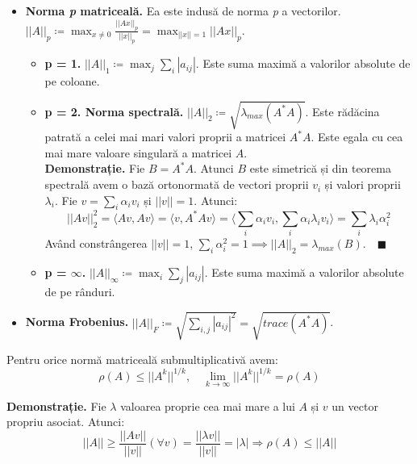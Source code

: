 \documentclass{exam}
\begin{document}
\begin{itemize}
	\item \textbf{Norma \textit{p} matriceală.} Ea este indusă de norma \textit{p} a vectorilor. \\
	      $||A||_p \coloneq \max_{x \neq 0} \frac{||Ax||_p}{||x||_p} = \max_{||x|| = 1} ||Ax||_p$.
	      \begin{itemize}
		      \item \textbf{p = 1.} $||A||_1 \coloneq \max_j \sum_i |a_{ij}|$. Este suma maximă a valorilor absolute
		            de pe coloane.
		      \item \textbf{p = 2. Norma spectrală.} $||A||_2 \coloneq \sqrt{\lambda_{max}(A^*A)}$.
		            Este rădăcina patrată a celei mai mari valori proprii a matricei $A^*A$.
		            Este egala cu cea mai mare valoare singulară a matricei $A$. \\
		            \textbf{Demonstrație.} Fie $B = A^*A$. Atunci $B$ este
		            simetrică și din teorema spectrală avem o bază ortonormată
		            de vectori proprii $v_i$ și valori proprii $\lambda_i$.
		            Fie $v = \sum_i \alpha_i v_i$ și $||v|| = 1$. Atunci:
		            \begin{equation*}
			            ||Av||^2_2 = \langle Av, Av \rangle = \langle v, A^*Av \rangle = \langle  \sum_{i} \alpha_i v_i, \sum_{i} \alpha_i \lambda_i v_i \rangle = \sum_{i} \lambda_i \alpha_i^2
		            \end{equation*}
		            Având constrângerea $||v|| = 1$, $\sum_{i} \alpha_i^2 = 1 \implies ||A||_2 = \lambda_{max}(B). \quad \blacksquare$

		      \item \textbf{p = $\infty$.} $||A||_{\infty} \coloneq \max_i \sum_j |a_{ij}|$. Este suma maximă a valorilor
		            absolute de pe rânduri.
	      \end{itemize}
	\item \textbf{Norma Frobenius.} $||A||_F \coloneq \sqrt{\sum_{i,j} |a_{ij}|^2} = \sqrt{trace(A^*A)}$.
\end{itemize}

Pentru orice normă matriceală submultiplicativă avem:
\begin{equation*}
	\rho(A) \leq ||A^k||^{1/k}, \quad \lim_{k \to \infty} ||A^k||^{1/k} = \rho(A)
\end{equation*}

\textbf{Demonstrație.} Fie $\lambda$ valoarea proprie cea mai mare a lui $A$ și $v$ un vector propriu asociat. Atunci:
\begin{equation*}
	||A|| \geq \frac{||Av||}{||v||} (\forall v) = \frac{||\lambda v||}{||v||} = |\lambda| \Rightarrow \rho(A) \leq ||A||
\end{equation*}
\end{document}
